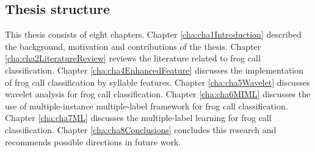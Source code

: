  
 
\subsection{Thesis structure} 
 
This thesis consists of eight chapters. Chapter \ref{cha:cha1Introduction} described the background, motivation and contributions of the thesis. Chapter \ref{cha:cha2LiteratureReview} reviews the literature related to frog call classification. Chapter \ref{cha:cha4EnhancedFeature} discusses the implementation of frog call classification by syllable features. Chapter \ref{cha:cha5Wavelet} discusses wavelet analysis for frog call classification. Chapter \ref{cha:cha6MIML} discusses the use of multiple-instance multiple-label framework for frog call classification. Chapter \ref{cha:cha7ML} discusses the multiple-label learning for frog call classification. Chapter \ref{cha:cha8Conclusions} concludes this research and recommends possible directions in future work.

